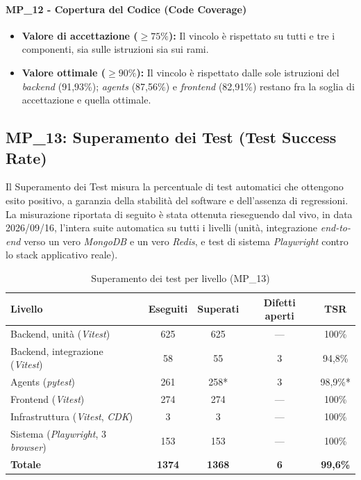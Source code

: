 \documentclass[12pt, a4paper]{article}
\begin{document}
\paragraph*{MP\_12 - Copertura del Codice (Code Coverage)}
\begin{itemize}
    \item \textbf{Valore di accettazione ($\ge 75\%$):} Il vincolo è rispettato su tutti e tre i componenti, sia sulle istruzioni sia sui rami.
    \item \textbf{Valore ottimale ($\ge 90\%$):} Il vincolo è rispettato dalle sole istruzioni del \textit{backend} (91,93\%); \textit{agents} (87,56\%) e \textit{frontend} (82,91\%) restano fra la soglia di accettazione e quella ottimale.
\end{itemize}

\subsection{MP\_13: Superamento dei Test (Test Success Rate)}
Il Superamento dei Test misura la percentuale di test automatici che ottengono esito positivo, a garanzia della stabilità del software e dell'assenza di regressioni. La misurazione riportata di seguito è stata ottenuta rieseguendo dal vivo, in data 2026/09/16, l'intera suite automatica su tutti i livelli (unità, integrazione \textit{end-to-end} verso un vero \textit{MongoDB} e un vero \textit{Redis}, e test di sistema \textit{Playwright} contro lo stack applicativo reale).

\begin{table}[htbp]
    \centering
    \renewcommand{\arraystretch}{1.3}
    \begin{tabular}{|l|c|c|c|c|}
        \hline
        \textbf{Livello} & \textbf{Eseguiti} & \textbf{Superati} & \textbf{Difetti aperti} & \textbf{TSR} \\ \hline
        Backend, unità (\textit{Vitest}) & 625 & 625 & --- & 100\% \\ \hline
        Backend, integrazione (\textit{Vitest}) & 58 & 55 & 3 & 94,8\% \\ \hline
        Agents (\textit{pytest}) & 261 & 258* & 3 & 98,9\%* \\ \hline
        Frontend (\textit{Vitest}) & 274 & 274 & --- & 100\% \\ \hline
        Infrastruttura (\textit{Vitest}, \textit{CDK}) & 3 & 3 & --- & 100\% \\ \hline
        Sistema (\textit{Playwright}, 3 \textit{browser}) & 153 & 153 & --- & 100\% \\ \hline
        \textbf{Totale} & \textbf{1374} & \textbf{1368} & \textbf{6} & \textbf{99,6\%} \\ \hline
    \end{tabular}
    \caption{Superamento dei test per livello (MP\_13)}
    \label{tab:mp13_pass_rate}
\end{table}
\end{document}
